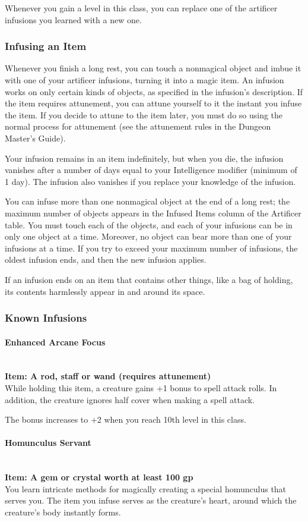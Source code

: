 {Whenever you gain a level in this class, you can replace one of the artificer infusions you learned with a new one.
\subsubsection*{Infusing an Item}
Whenever you finish a long rest, you can touch a nonmagical object and imbue it with one of your artificer infusions, turning it into a magic item. An infusion works on only certain kinds of objects, as specified in the infusion's description. If the item requires attunement, you can attune yourself to it the instant you infuse the item. If you decide to attune to the item later, you must do so using the normal process for attunement (see the attunement rules in the Dungeon Master's Guide).

Your infusion remains in an item indefinitely, but when you die, the infusion vanishes after a number of days equal to your Intelligence modifier (minimum of 1 day). The infusion also vanishes if you replace your knowledge of the infusion.

You can infuse more than one nonmagical object at the end of a long rest; the maximum number of objects appears in the Infused Items column of the Artificer table. You must touch each of the objects, and each of your infusions can be in only one object at a time. Moreover, no object can bear more than one of your infusions at a time. If you try to exceed your maximum number of infusions, the oldest infusion ends, and then the new infusion applies.

If an infusion ends on an item that contains other things, like a bag of holding, its contents harmlessly appear in and around its space.
\subsubsection*{Known Infusions}
\paragraph*{Enhanced Arcane Focus}\hfill\\
\textbf{Item: A rod, staff or wand (requires attunement)}\\
While holding this item, a creature gains +1 bonus to spell attack rolls. In addition, the creature ignores half cover when making a spell attack.

The bonus increases to +2 when you reach 10th level in this class.\\
\paragraph*{Homunculus Servant}\hfill\\
\textbf{Item: A gem or crystal worth at least 100 gp}\\
You learn intricate methods for magically creating a special homunculus that serves you. The item you infuse serves as the creature's heart, around which the creature's body instantly forms.

}
